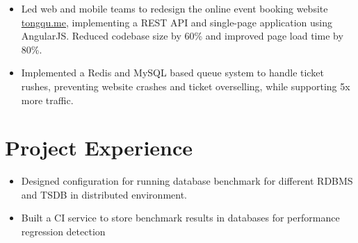 \documentclass[11pt, letterpaper]{simple-cv}
\begin{document}

\begin{itemize}
	\item Led web and mobile teams to redesign the online event booking website \href{https://tongqu.me}{tongqu.me},
	implementing a REST API and single-page application using AngularJS.
	Reduced codebase size by 60\% and improved page load time by 80\%.
	\item Implemented a Redis and MySQL based queue system to handle ticket rushes, preventing website crashes and ticket overselling, while supporting 5x more traffic.
\end{itemize}

\section{Project Experience}




\begin{itemize}
	\item Designed configuration for running database benchmark for different RDBMS and TSDB in distributed environment.
	\item Built a CI service to store benchmark results in databases for performance regression detection
\end{itemize}
\end{document}
